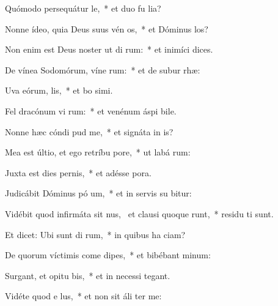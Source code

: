 \item Quómodo persequátur  le,~* et duo fu  lia?
\item Nonne ídeo, quia Deus suus vén os,~* et Dóminus  los?
\item Non enim est Deus noster ut di rum:~* et inimíci   dices.
\item De vínea Sodomórum, víne rum:~* et de subur rhæ:
\item Uva eórum,  lis,~* et bo simi.
\item Fel dracónum vi rum:~* et venénum áspi bile.
\item Nonne hæc cóndi  pud me,~* et signáta in  is?
\item Mea est últio, et ego retríbu  pore,~* ut labá  rum:
\item Juxta est dies pernis,~* et adésse  pora.
\item Judicábit Dóminus pó um,~* et in servis su bitur:
\item Vidébit quod infirmáta sit nus,~\pscross{} et clausi quoque runt,~* residu ti sunt.
\item Et dicet: Ubi sunt di rum,~* in quibus ha ciam?
\item De quorum víctimis come dipes,~* et bibébant  minum:
\item Surgant, et opitu bis,~* et in necessi  tegant.
\item Vidéte quod e  lus,~* et non sit áli  ter me:
